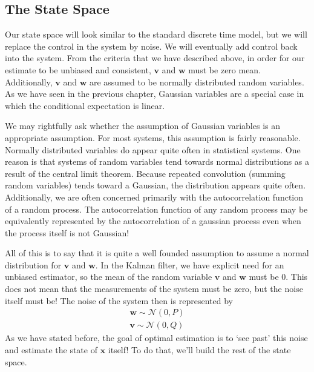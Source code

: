 \subsection{The State Space}

Our state space will look similar to the standard discrete time model, but we will replace the control in the system by noise. We will eventually add control back into the system. From the criteria that we have described above, in order for our estimate to be unbiased and consistent, $\bm{v}$ and $\bm{w}$ must be zero mean. Additionally, $\bm{v}$ and $\bm{w}$ are assumed to be normally distributed random variables. As we have seen in the previous chapter, Gaussian variables are a special case in which the conditional expectation is linear.

We may rightfully ask whether the assumption of Gaussian variables is an appropriate assumption. For most systems, this assumption is fairly reasonable. Normally distributed variables do appear quite often in statistical systems. One reason is that systems of random variables tend towards normal distributions as a result of the central limit theorem. Because repeated convolution (summing random variables) tends toward a Gaussian, the distribution appears quite often. Additionally, we are often concerned primarily with the autocorrelation function of a random process. The autocorrelation function of any random process may be equivalently represented by the autocorrelation of a gaussian process even when the process itself is not Gaussian!

All of this is to say that it is quite a well founded assumption to assume a normal distribution for $\bm{v}$ and $\bm{w}$. In the Kalman filter, we have explicit need for an unbiased estimator, so the mean of the random variable $\bm{v}$ and $\bm{w}$ must be 0. This does not mean that the measurements of the system must be zero, but the noise itself must be! The noise of the system then is represented by 
\begin{gather}
\bm{w}\sim\mathcal{N}(0,P)\\
\bm{v}\sim\mathcal{N}(0,Q)
\end{gather}
As we have stated before, the goal of optimal estimation is to `see past' this noise and estimate the state of $\bm{x}$ itself! To do that, we'll build the rest of the state space. 

